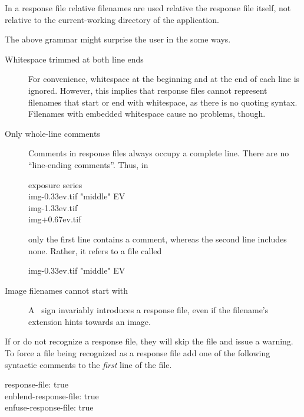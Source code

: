 In a response file relative filenames are used relative the response file itself, not relative
to the current-working directory of the application.

The above grammar might surprise the user in the some ways.

\begin{description}
\item[Whitespace trimmed at both line ends]\itemend
  For convenience, whitespace at the beginning and at the end of each line is ignored.  However,
  this implies that response files cannot represent filenames that start or end with whitespace,
  as there is no quoting syntax.  Filenames with embedded whitespace cause no problems, though.

\item[Only whole-line comments]\itemend
  Comments in response files always occupy a complete line.  There are no ``line-ending
  comments''.  Thus, in

  \begin{literal}
     exposure series \\
    img-0.33ev.tif  "middle" EV \\
    img-1.33ev.tif \\
    img+0.67ev.tif \\
  \end{literal}

  only the first line contains a comment, whereas the second line includes none.  Rather, it
  refers to a file called

  \begin{literal}
    img-0.33ev.tif  "middle" EV
  \end{literal}

\item[Image filenames cannot start with ]\itemend
  A ~sign invariably introduces a response file, even
  if the filename's extension hints towards an image.
\end{description}

%
If \App{} or \OtherApp{} do not recognize a response file, they will skip the file and issue a
warning.  To force a file being recognized as a response file add one of the following syntactic
comments to the \emph{first} line of the file.

\begin{literal}
  response-file: true \\
  enblend-response-file: true \\
  enfuse-response-file: true \\
\end{literal}

